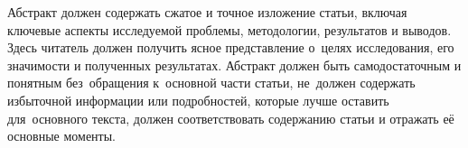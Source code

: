 Абстракт должен содержать сжатое и точное изложение статьи,
включая ключевые аспекты исследуемой проблемы, методологии, результатов и выводов.
Здесь читатель должен получить ясное представление о~целях исследования, его значимости и полученных результатах.
Абстракт должен быть самодостаточным и понятным без~обращения к~основной части статьи,
не~должен содержать избыточной информации или подробностей, которые лучше оставить для~основного текста,
должен соответствовать содержанию статьи и отражать её основные моменты.
